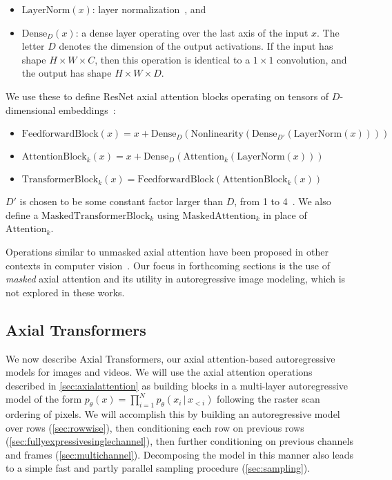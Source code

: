 \documentclass{article} \usepackage{iclr2020_conference,times}
\begin{document}
\begin{itemize}
    \item $\text{LayerNorm}(x)$: layer normalization~\citep{ba2016layer}, and
    \item $\text{Dense}_D(x)$: a dense layer operating over the last axis of the input $x$. The letter $D$ denotes the dimension of the output activations. If the input has shape $H \times W \times C$, then this operation is identical to a $1 \times 1$ convolution, and the output has shape $H \times W \times D$.
\end{itemize}

We use these to define ResNet axial attention blocks operating on tensors of $D$-dimensional embeddings~\citep{vaswani2017attention,child2019generating}:

\begin{itemize}
\item $\text{FeedforwardBlock}(x) = x + \text{Dense}_D(\text{Nonlinearity}(\text{Dense}_{D'}(\text{LayerNorm}(x))))$
\item $\text{AttentionBlock}_k(x) = x + \text{Dense}_D(\text{Attention}_k(\text{LayerNorm}(x)))$
\item $\text{TransformerBlock}_k(x) = \text{FeedforwardBlock}(\text{AttentionBlock}_k(x))$
\end{itemize}

$D'$ is chosen to be some constant factor larger than $D$, from 1 to 4~\citep{vaswani2017attention}. We also define a $\text{MaskedTransformerBlock}_k$ using $\text{MaskedAttention}_k$ in place of $\text{Attention}_k$.

Operations similar to unmasked axial attention have been proposed in other contexts in computer vision~\citep{huang2019ccnet}. Our focus in forthcoming sections is the use of \emph{masked} axial attention and its utility in autoregressive image modeling, which is not explored in these works.


\FloatBarrier

\subsection{Axial Transformers}

\label{sec:model}

We now describe Axial Transformers, our axial attention-based autoregressive models for images and videos. We will use the axial attention operations described in \cref{sec:axialattention} as building blocks in a multi-layer autoregressive model of the form $p_\theta(x) = \prod_{i=1}^N p_\theta(x_i \,|\, x_{<i})$ following the raster scan ordering of pixels. We will accomplish this by building an autoregressive model over rows (\cref{sec:rowwise}), then conditioning each row on previous rows (\cref{sec:fullyexpressivesinglechannel}), then further conditioning on previous channels and frames (\cref{sec:multichannel}). Decomposing the model in this manner also leads to a simple fast and partly parallel sampling procedure (\cref{sec:sampling}).
\end{document}
